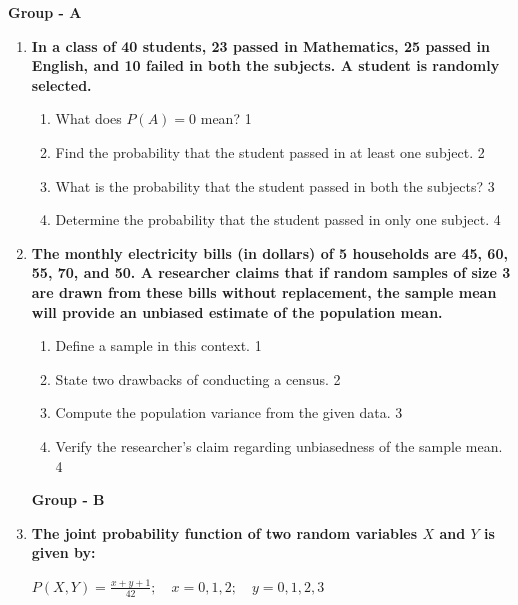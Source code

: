 \documentclass[12pt]{article}
\begin{document}
\begin{center}
\textbf{Group  - A}
\end{center}
 \begin{enumerate}
 
 \item
  \textbf{In a class of 40 students, 23 passed in Mathematics, 25 passed in English, and 10 failed in both the subjects. A student is randomly selected.}

  \begin{enumerate}
    \item
	What does $P(A) = 0$ mean? \hfill 1
    \item
	Find the probability that the student passed in at least one subject. \hfill 2
    \item  
	What is the probability that the student passed in both the subjects? \hfill 3
    \item
	Determine the probability that the student passed in only one subject. \hfill 4
  \end{enumerate} 

\item
  \textbf{The monthly electricity bills (in dollars) of 5 households are 45, 60, 55, 70, and 50. A researcher claims that if random samples of size 3 are drawn from these bills without replacement, the sample mean will provide an unbiased estimate of the population mean.}

  
  \begin{enumerate}
    \item
    Define a sample in this context. \hfill 1
    \item
    State two drawbacks of conducting a census. \hfill 2
    \item  
    Compute the population variance from the given data. \hfill 3
    \item
    Verify the researcher's claim regarding unbiasedness of the sample mean. \hfill 4
  \end{enumerate}




  \begin{center}
\textbf{Group  - B}
\end{center}

  \item
  \textbf{The joint probability function of two random variables \( X \) and \( Y \) is given by:}
  
  \begin{center}
  \( \displaystyle P(X,Y) = \frac{x + y + 1}{42}; \quad x = 0, 1, 2; \quad y = 0, 1, 2, 3 \)
  \end{center}
 

\end{enumerate}
\end{document}
